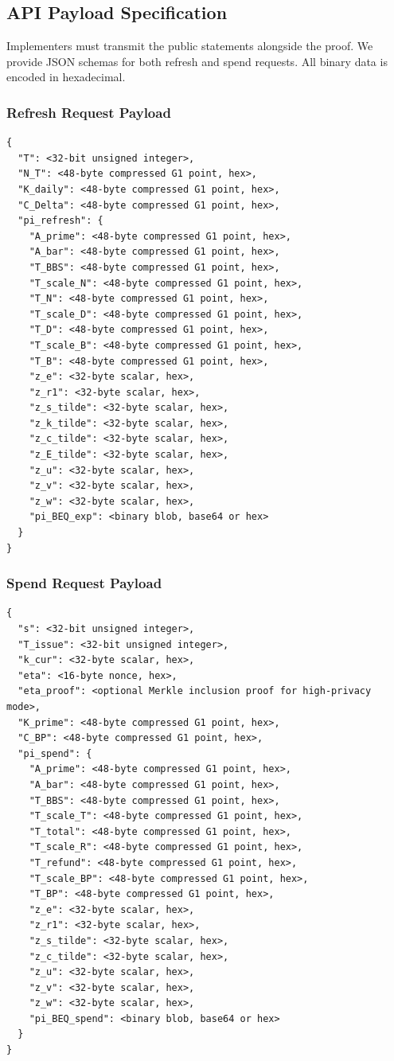 \documentclass[11pt]{article}
\theoremstyle{definitionstyle}
\theoremstyle{plain}
\begin{document}
\subsection{API Payload Specification}

Implementers must transmit the public statements alongside the proof. We provide JSON schemas for both refresh and spend requests. All binary data is encoded in hexadecimal.

\subsubsection{Refresh Request Payload}
\begin{verbatim}
{
  "T": <32-bit unsigned integer>,
  "N_T": <48-byte compressed G1 point, hex>,
  "K_daily": <48-byte compressed G1 point, hex>,
  "C_Delta": <48-byte compressed G1 point, hex>,
  "pi_refresh": {
    "A_prime": <48-byte compressed G1 point, hex>,
    "A_bar": <48-byte compressed G1 point, hex>,
    "T_BBS": <48-byte compressed G1 point, hex>,
    "T_scale_N": <48-byte compressed G1 point, hex>,
    "T_N": <48-byte compressed G1 point, hex>,
    "T_scale_D": <48-byte compressed G1 point, hex>,
    "T_D": <48-byte compressed G1 point, hex>,
    "T_scale_B": <48-byte compressed G1 point, hex>,
    "T_B": <48-byte compressed G1 point, hex>,
    "z_e": <32-byte scalar, hex>,
    "z_r1": <32-byte scalar, hex>,
    "z_s_tilde": <32-byte scalar, hex>,
    "z_k_tilde": <32-byte scalar, hex>,
    "z_c_tilde": <32-byte scalar, hex>,
    "z_E_tilde": <32-byte scalar, hex>,
    "z_u": <32-byte scalar, hex>,
    "z_v": <32-byte scalar, hex>,
    "z_w": <32-byte scalar, hex>,
    "pi_BEQ_exp": <binary blob, base64 or hex>
  }
}
\end{verbatim}

\subsubsection{Spend Request Payload}
\begin{verbatim}
{
  "s": <32-bit unsigned integer>,
  "T_issue": <32-bit unsigned integer>,
  "k_cur": <32-byte scalar, hex>,
  "eta": <16-byte nonce, hex>,
  "eta_proof": <optional Merkle inclusion proof for high-privacy mode>,
  "K_prime": <48-byte compressed G1 point, hex>,
  "C_BP": <48-byte compressed G1 point, hex>,
  "pi_spend": {
    "A_prime": <48-byte compressed G1 point, hex>,
    "A_bar": <48-byte compressed G1 point, hex>,
    "T_BBS": <48-byte compressed G1 point, hex>,
    "T_scale_T": <48-byte compressed G1 point, hex>,
    "T_total": <48-byte compressed G1 point, hex>,
    "T_scale_R": <48-byte compressed G1 point, hex>,
    "T_refund": <48-byte compressed G1 point, hex>,
    "T_scale_BP": <48-byte compressed G1 point, hex>,
    "T_BP": <48-byte compressed G1 point, hex>,
    "z_e": <32-byte scalar, hex>,
    "z_r1": <32-byte scalar, hex>,
    "z_s_tilde": <32-byte scalar, hex>,
    "z_c_tilde": <32-byte scalar, hex>,
    "z_u": <32-byte scalar, hex>,
    "z_v": <32-byte scalar, hex>,
    "z_w": <32-byte scalar, hex>,
    "pi_BEQ_spend": <binary blob, base64 or hex>
  }
}
\end{verbatim}
\end{document}
